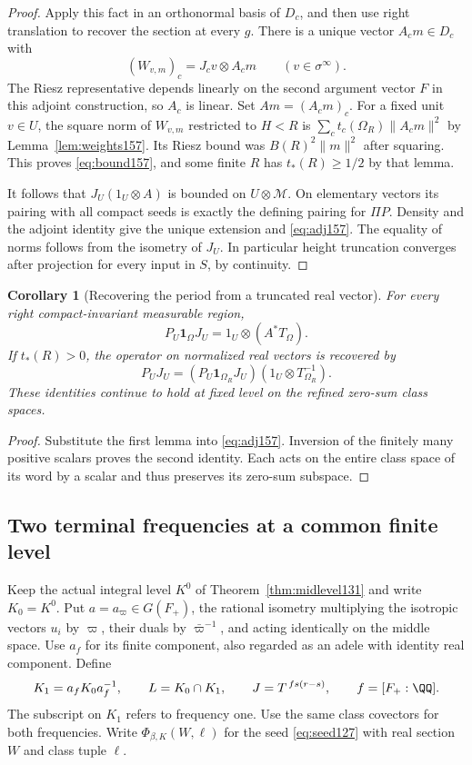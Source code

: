 \documentclass[a4paper,11pt]{article}
\newtheorem{corollary}[proposition]{Corollary}
\theoremstyle{definition}
\theoremstyle{remark}
\numberwithin{equation}{section}
\begin{document}
\begin{proof}
Apply this fact in an orthonormal basis of \(D_c\), and then
use right translation to recover the section at every \(g\).
There is a unique vector \(A_c m\in D_c\) with
\[
              (W_{v,m})_c=J_c v\otimes A_c m
                        \qquad (v\in\sigma^\infty).
\]
The Riesz representative depends linearly on the second
argument vector \(F\) in this adjoint construction, so \(A_c\)
is linear. Set \(Am=(A_cm)_c\). For a fixed unit \(v\in U\),
the square norm of \(W_{v,m}\) restricted to \(H<R\) is
\(\sum_c t_c(\Omega_R)\|A_c m\|^2\) by Lemma~\ref{lem:weights157}.
Its Riesz bound was \(B(R)^2\|m\|^2\) after squaring. This
proves \eqref{eq:bound157}, and some finite \(R\) has
\(t_*(R)\ge1/2\) by that lemma.

It follows that \(J_U(1_U\otimes A)\) is bounded on \(U\otimes
\mathcal M\). On elementary vectors its pairing with all compact
seeds is exactly the defining pairing for \(\Pi P\). Density
and the adjoint identity give the unique extension and
\eqref{eq:adj157}. The equality of norms follows from the
isometry of \(J_U\). In particular height truncation converges
after projection for every input in \(S\), by continuity.
\end{proof}

\begin{corollary}[Recovering the period from a truncated real vector]
\label{cor:mass157}
For every right compact-invariant measurable region,
\[
           P_U\mathbf1_\Omega J_U=1_U\otimes(A^*T_\Omega).
\]
If \(t_*(R)>0\), the operator on normalized real vectors is
recovered by
\[
       P_U J_U=(P_U\mathbf1_{\Omega_R}J_U)
                         (1_U\otimes T_{\Omega_R}^{-1}).
\]
These identities continue to hold at fixed level on the refined
zero-sum class spaces.
\end{corollary}
\begin{proof}
Substitute the first lemma into \eqref{eq:adj157}. Inversion
of the finitely many positive scalars proves the second identity.
Each acts on the entire class space of its word by a scalar
and thus preserves its zero-sum subspace.
\end{proof}

\subsection{Two terminal frequencies at a common finite level}\label{nav:VII-09}
\label{sec:adelic159}

Keep the actual integral level \(K^0\) of
Theorem~\ref{thm:midlevel131} and write \(K_0=K^0\).
Put \(a=a_\varpi\in G(F_+)\), the rational isometry multiplying
the isotropic vectors \(u_i\) by \(\varpi\), their duals by
\(\bar\varpi^{-1}\), and acting identically on the middle space.
Use \(a_f\) for its finite component, also regarded as an adele
with identity real component. Define
\[
       K_1=a_fK_0a_f^{-1},\qquad L=K_0\cap K_1,\qquad
       J=T^{\,fs(r-s)},\qquad f=[F_+:\QQ].
\]
The subscript on \(K_1\) refers to frequency one. Use the
same class covectors for both frequencies. Write
\(\Phi_{\beta,K}(W,\ell)\) for the seed \eqref{eq:seed127}
with real section \(W\) and class tuple \(\ell\).
\end{document}
